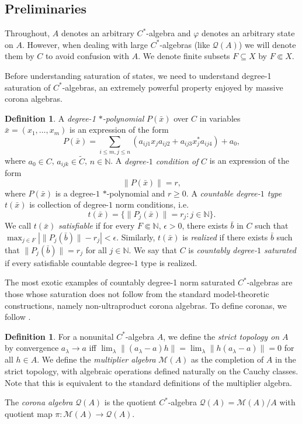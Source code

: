 \documentclass[10pt]{amsart}
\theoremstyle{definition}
\newtheorem{defn}[thm]{Definition}
\begin{document}
\subsection{Preliminaries}

Throughout, $A$ denotes an arbitrary $C^*$-algebra and $\varphi$ denotes an arbitrary state on $A$. However, when dealing with large $C^*$-algebras (like $\mathscr{Q}(A)$) we will denote them by $C$ to avoid confusion with $A$. We denote finite subsets $F\subseteq X$ by $F\Subset X$.

Before understanding saturation of states, we need to understand degree-1 saturation of $C^*$-algebras, an extremely powerful property enjoyed by massive corona algebras.

\begin{defn}\label{normsat}
    A \textit{degree-1 $*$-polynomial} $P(\bar{x})$ over $C$ in variables $\bar{x}=(x_1,\dots,x_m)$ is an expression of the form
    \[P(\bar{x})=\sum_{i\leq m,j\leq n}(a_{ij1}x_ja_{ij2}+a_{ij3}x_j^*a_{ij4})+a_0,\]
    where $a_0\in C$, $a_{ijk}\in \tilde{C}$, $n\in\mathbb{N}$. A \textit{degree-$1$ condition of }$C$ is an expression of the form
    \[\|P(\bar{x})\|=r,\]
    where $P(\bar{x})$ is a degree-$1$ $*$-polynomial and $r\geq0$. A \textit{countable degree-$1$ type} $t(\bar{x})$ is collection of degree-$1$ norm conditions, i.e.
    \[t(\bar{x})=\{\|P_j(\bar{x})\|=r_j:j\in\mathbb{N}\}.\]
    We call $t(\bar{x})$ \textit{satisfiable} if for every $F\Subset \mathbb{N}$, $\epsilon>0$, there exists $\bar{b}$ in $C$ such that $\max_{j\in F}|\|P_j(\bar{b})\|-r_j|<\epsilon$. Similarly, $t(\bar{x})$ is \textit{realized} if there exists $\bar{b}$ such that $\|P_j(\bar{b})\|=r_j$ for all $j\in\mathbb{N}$. We say that $C$ is \textit{countably degree-$1$ saturated} if every satisfiable countable degree-$1$ type is realized.
\end{defn}

The most exotic examples of countably degree-1 norm saturated $C^*$-algebras are those whose saturation does not follow from the standard model-theoretic constructions, namely non-ultraproduct corona algebras. To define coronas, we follow \cite[13]{FA19}.

\begin{defn}\label{corona}
    For a nonunital $C^*$-algebra $A$, we define the \textit{strict topology on} $A$ by convergence $a_\lambda\rightarrow a$ iff $\lim_\lambda\|(a_\lambda-a)h\|=\lim_\lambda\|h(a_\lambda-a)\|=0$ for all $h\in A$. We define the \textit{multiplier algebra} $\mathscr{M}(A)$ as the completion of $A$ in the strict topology, with algebraic operations defined naturally on the Cauchy classes. Note that this is equivalent to the standard definitions of the multiplier algebra.

    The \textit{corona algebra} $\mathscr{Q}(A)$ is the quotient $C^*$-algebra $\mathscr{Q}(A)=\mathscr{M}(A)/A$ with quotient map $\pi:\mathscr{M}(A)\rightarrow\mathscr{Q}(A)$.
\end{defn}
\end{document}

